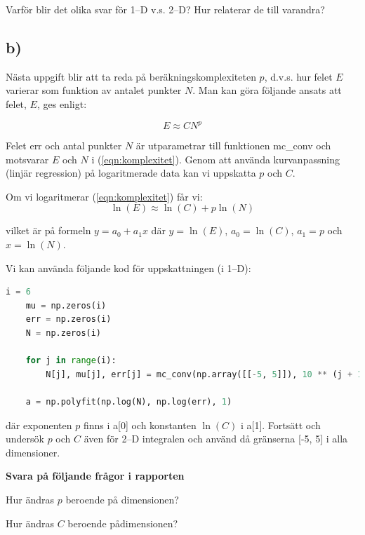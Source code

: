 \documentclass[a4paper]{article}
\begin{document}
Varför blir det olika svar för 1--D v.s. 2--D? Hur relaterar de till varandra?


\subsection{b)}
Nästa uppgift blir att ta reda på beräkningskomplexiteten \(p\), d.v.s.
hur felet \(E\) varierar som funktion av antalet punkter \(N\).
Man kan göra följande ansats att felet, \(E\), ges enligt:

\begin{equation} \label{eqn:komplexitet}
    E \approx CN^p
\end{equation}

Felet err och antal punkter \( N \)  är utparametrar till funktionen mc\_conv
och motsvarar \(E\)  och \(N\) i (\ref{eqn:komplexitet}).
Genom att använda kurvanpassning (linjär regression) på logaritmerade data kan vi uppskatta \(p\) och \(C\).

Om vi logaritmerar (\ref{eqn:komplexitet}) får vi:
\begin{equation} \label{eqn:loggad}
    \ln (E) \approx \ln (C) +p \ln (N)
\end{equation}

vilket är på formeln \(y=a_0+a_1x\) där \(y=\ln(E)\), \(a_0=\ln(C)\), \(a_1=p\) och \(x=\ln(N)\).


Vi kan använda följande kod för uppskattningen (i 1--D):

\begin{lstlisting}[language=Python]
    i = 6
    mu = np.zeros(i)
    err = np.zeros(i)
    N = np.zeros(i)

    for j in range(i):
        N[j], mu[j], err[j] = mc_conv(np.array([[-5, 5]]), 10 ** (j + 1))

    a = np.polyfit(np.log(N), np.log(err), 1)
\end{lstlisting}

där exponenten \(p\) finns i a[0] och konstanten \( \ln (C) \) i a[1].
Fortsätt och undersök \( p \)  och \( C \)  även för 2--D integralen och
använd då gränserna [-5, 5] i alla dimensioner.

\textbf{Svara på följande frågor i rapporten}

Hur ändras \( p \) beroende på dimensionen?

Hur ändras \( C \) beroende pådimensionen?
\end{document}
